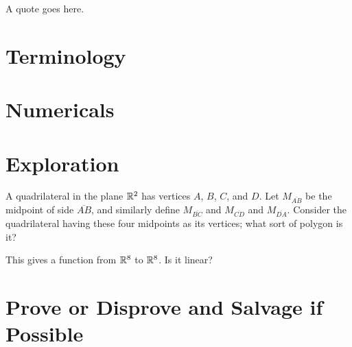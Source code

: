 \documentclass{homework}
\author{Jim Fowler}
\begin{document}
\maketitle

\begin{inspiration}
A quote goes here.
\end{inspiration}

\section{Terminology}

\section{Numericals}

\section{Exploration}

\begin{problem}
  A quadrilateral in the plane $\mathbb{R}^2$ has vertices $A$, $B$, $C$, and
  $D$.  Let $M_{\overline{AB}}$ be the midpoint of side
  $\overline{AB}$, and similarly define $M_{\overline{BC}}$ and
  $M_{\overline{CD}}$ and $M_{\overline{DA}}$.  Consider the
  quadrilateral having these four midpoints as its vertices; what sort
  of polygon is it?

  This gives a function from $\mathbb{R}^8$ to $\mathbb{R}^8$.  Is it linear?
\end{problem}


\section{Prove or Disprove and Salvage if Possible}
\end{document}
